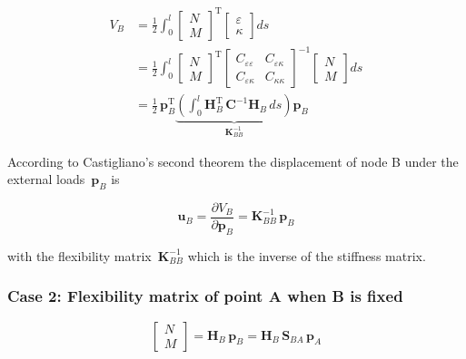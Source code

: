 \begin{align}
V_B &= \frac{1}{2}\int_{0}^{l}
\begin{bmatrix}
N \\ M
\end{bmatrix}^\mathrm{T}
\begin{bmatrix}
\varepsilon \\ \kappa
\end{bmatrix}
ds \\
&= \frac{1}{2}\int_{0}^{l}
\begin{bmatrix}
N \\ M
\end{bmatrix}^\mathrm{T}
\begin{bmatrix}
C_{\varepsilon\varepsilon} & C_{\varepsilon\kappa}\\
C_{\varepsilon\kappa} & C_{\kappa\kappa}
\end{bmatrix}^{-1}
\begin{bmatrix}
N \\ M
\end{bmatrix}
ds \\
&= \frac{1}{2}\,\boldsymbol{p}_B^\mathrm{T}
\underbrace{
\left(\int_{0}^{l} \boldsymbol{H}_B^\mathrm{T}\,
\boldsymbol{C}^{-1}\boldsymbol{H}_B\,ds\right)
}_{\boldsymbol{K}_{BB}^{-1}}
\boldsymbol{p}_B
\end{align}

According to Castigliano's second theorem the displacement of node B under the external loads~$\boldsymbol{p}_B$ is

\begin{equation}
\boldsymbol{u}_{B} = \frac{\partial V_B}{\partial \boldsymbol{p}_B} = \boldsymbol{K}_{BB}^{-1}\,\boldsymbol{p}_B
\end{equation}

with the flexibility matrix~$\boldsymbol{K}_{BB}^{-1}$ which is the inverse of the stiffness matrix.

\subsubsection*{Case 2: Flexibility matrix of point A when B is fixed}

\begin{equation}
\begin{bmatrix}
N \\ M
\end{bmatrix}
= \boldsymbol{H}_B\,\boldsymbol{p}_B = \boldsymbol{H}_B\,\boldsymbol{S}_{BA}\,\boldsymbol{p}_A
\end{equation}

